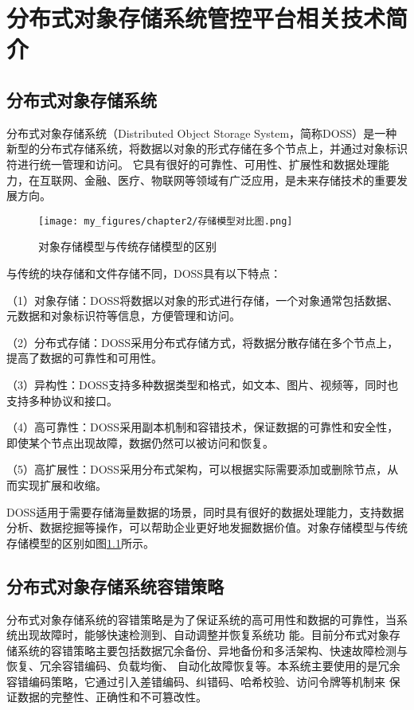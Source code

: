 \chapter{分布式对象存储系统管控平台相关技术简介}

\section{分布式对象存储系统}

分布式对象存储系统（Distributed Object Storage System，简称DOSS）是一种新型的分布式存储系统，将数据以对象的形式存储在多个节点上，并通过对象标识符进行统一管理和访问。
它具有很好的可靠性、可用性、扩展性和数据处理能力\cite{kongeji}，在互联网、金融、医疗、物联网等领域有广泛应用，是未来存储技术的重要发展方向。

\begin{figure}[h]
    \centering
    \texttt{[image: my\_figures/chapter2/存储模型对比图.png]}
    \caption{对象存储模型与传统存储模型的区别}
    \label{fig:/存储模型对比图}
\end{figure}

与传统的块存储和文件存储不同，DOSS具有以下特点：

（1）对象存储：DOSS将数据以对象的形式进行存储，一个对象通常包括数据、元数据和对象标识符等信息，方便管理和访问。

（2）分布式存储：DOSS采用分布式存储方式，将数据分散存储在多个节点上，提高了数据的可靠性和可用性。

（3）异构性：DOSS支持多种数据类型和格式，如文本、图片、视频等，同时也支持多种协议和接口\cite{kongqng2015keji}。

（4）高可靠性：DOSS采用副本机制和容错技术，保证数据的可靠性和安全性，即使某个节点出现故障，数据仍然可以被访问和恢复。

（5）高扩展性：DOSS采用分布式架构，可以根据实际需要添加或删除节点，从而实现扩展和收缩。

DOSS适用于需要存储海量数据的场景，同时具有很好的数据处理能力，支持数据分析、数据挖掘等操作，可以帮助企业更好地发掘数据价值。对象存储模型与传统存储模型的区别如图\ref{fig:/存储模型对比图}所示。

\section{分布式对象存储系统容错策略}

分布式对象存储系统的容错策略是为了保证系统的高可用性和数据的可靠性，当系统出现故障时，能够快速检测到、自动调整并恢复系统功
能。目前分布式对象存储系统的容错策略主要包括数据冗余备份、异地备份和多活架构、快速故障检测与恢复、冗余容错编码、负载均衡、
自动化故障恢复等。本系统主要使用的是冗余容错编码策略，它通过引入差错编码、纠错码、哈希校验、访问令牌等机制来
保证数据的完整性、正确性和不可篡改性。

